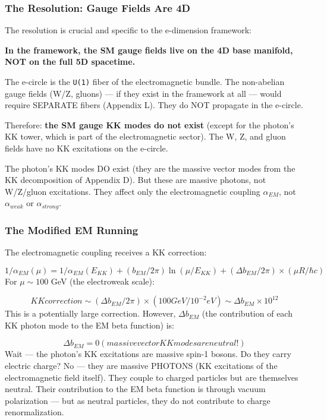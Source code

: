 \documentclass[aps,prd,preprint,superscriptaddress,longbibliography,floatfix]{revtex4-2}
\theoremstyle{remark}
\begin{document}
\subsubsection{The Resolution: Gauge Fields Are 4D}

The resolution is crucial and specific to the e-dimension framework:

\textbf{In the framework, the SM gauge fields live on the 4D base manifold, NOT on the full 5D spacetime.}

The e-circle is the \texttt{U(1)} fiber of the electromagnetic bundle. The non-abelian gauge fields (W/Z, gluons) --- if they exist in the framework at all --- would require SEPARATE fibers (Appendix L). They do NOT propagate in the e-circle.

Therefore: \textbf{the SM gauge KK modes do not exist} (except for the photon's KK tower, which is part of the electromagnetic sector). The W, Z, and gluon fields have no KK excitations on the e-circle.

The photon's KK modes DO exist (they are the massive vector modes from the KK decomposition of Appendix D). But these are massive photons, not W/Z/gluon excitations. They affect only the electromagnetic coupling $\alpha_{EM}$, not $\alpha_{weak}$ or $\alpha_{strong}$.


\subsubsection{The Modified EM Running}

The electromagnetic coupling receives a KK correction:


\begin{equation}
    1/\alpha_{EM}(\mu) = 1/\alpha_{EM}(E_{KK}) + (b_{EM}/2\pi) \ln(\mu/E_{KK}) + (\Delta b_{EM}/2\pi) \times (\mu R/\hbar c)
\end{equation}
For $\mu \sim  100$ GeV (the electroweak scale):


\begin{equation}
    KK correction \sim  (\Delta b_{EM}/2\pi) \times (100 GeV / 10^{-2} eV) \sim  \Delta b_{EM} \times 10^{12}
\end{equation}
This is a potentially large correction. However, $\Delta b_{EM}$ (the contribution of each KK photon mode to the EM beta function) is:


\begin{equation}
    \Delta b_{EM} = 0 (massive vector KK modes are neutral!)
\end{equation}
Wait --- the photon's KK excitations are massive spin-1 bosons. Do they carry electric charge? No --- they are massive PHOTONS (KK excitations of the electromagnetic field itself). They couple to charged particles but are themselves neutral. Their contribution to the EM beta function is through vacuum polarization --- but as neutral particles, they do not contribute to charge renormalization.
\end{document}
